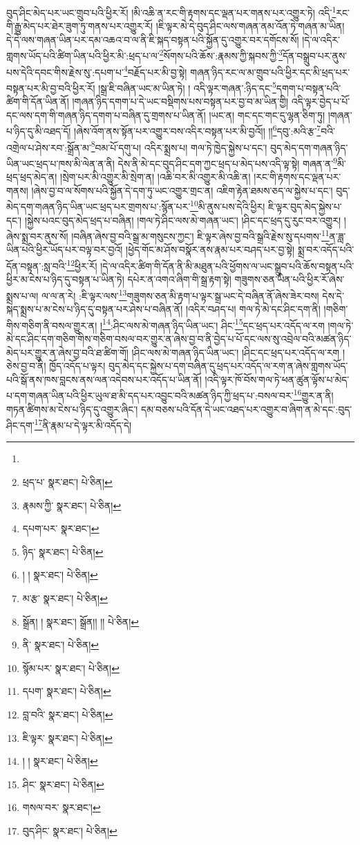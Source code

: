 བུད་ཤིང་མེད་པར་ཡང་གྲུབ་པའི་ཕྱིར་རོ། །མི་འཆི་ན་རང་གི་རྟགས་དང་ལྡན་པར་གནས་པར་འགྱུར་ཏེ། འདི་\footnote{}རང་གི་རྒྱུ་མེད་པར་ཐེར་ཟུག་ཏུ་གནས་པར་འགྱུར་རོ། །ཇི་ལྟར་མེ་དེ་བུད་ཤིང་ལས་གཞན་ནམ་འོན་ཏེ་གཞན་མ་ཡིན། དེ་དེ་ལས་གཞན་ཡིན་པར་དམ་འཆའ་བ་ལ་ནི་ཇི་སྐད་བསྟན་པའི་སྐྱོན་དུ་འགྱུར་བར་དགོངས་སོ། །དེ་ལ་འདིར་གླགས་ཡོད་པའི་ཚིག་ཡིན་པའི་ཕྱིར་མི་:ཕྲད་པ་ལ་\footnote{ཕྲད་པ་  སྣར་ཐང་།  པེ་ཅིན། }སོགས་པའི་ཆོས་:རྣམས་ཀྱི་སྐབས་ཀྱི་\footnote{རྣམས་ཀྱི་  སྣར་ཐང་།  པེ་ཅིན། }དོན་བསྒྲུབ་པར་ནུས་པས་དེའི་དབང་གིས་རྗེས་སུ་:དཔག་པ་\footnote{དཔག་པར་  སྣར་ཐང་། }བརྗོད་པར་མི་བྱ་སྟེ། གཞན་ཉིད་རང་ལ་མ་གྲུབ་པའི་ཕྱིར་དང་མི་ཕྲད་པར་བསྟན་པར་མི་བྱ་བའི་ཕྱིར་རོ། །སྒྲ་ཇི་བཞིན་ཡང་མ་ཡིན་ཏེ། །
འདི་ལྟར་གཞན་:ཉིད་དང་\footnote{ཉིད་  སྣར་ཐང་།  པེ་ཅིན། }དགག་པ་བསྟན་པའི་ཚིག་གི་དོན་ཡིན་ནོ། །གཞན་ཉིད་དགག་པ་དེ་ཡང་བསྡིགས་པས་བསྟན་པར་བྱ་བ་མ་ཡིན་གྱི། འདི་ལྟར་བྱེད་པ་པོ་དང་ལས་དག་གི་གཞན་ཉིད་དགག་པ་བཞིན་དུ་གྲགས་པ་ཡིན་ནོ། །ཡང་ན། གང་དང་གང་དུ་ལྷན་ཅིག་ཏུ། །གཞན་པ་ཉིད་དུ་མི་འཐད་དོ། །ཞེས་འོག་ནས་སྟོན་པར་འགྱུར་བས་འདིར་བསྟན་པར་མི་བྱའོ།། །།\footnote{། །  སྣར་ཐང་།  པེ་ཅིན། }དབུ་:མའི་རྩ་\footnote{མ་རྩ་  སྣར་ཐང་།  པེ་ཅིན། }བའི་འགྲེལ་པ་ཤེས་རབ་:སྒྲོན་མ་\footnote{སྒྲོན། །  སྣར་ཐང་། སྒྲོན།། །།  པེ་ཅིན། }བམ་པོ་དགུ་པ། འདིར་སྨྲས་པ། གལ་ཏེ་ཁྱེད་སྐྱེས་པ་དང་། བུད་མེད་དག་གཞན་ཉིད་ཡིན་ཡང་ཕྲད་པ་ཁས་མི་ལེན་ན་ནི། དེས་ནི་མེ་དང་བུད་ཤིང་དག་ཀྱང་ཕྲད་པ་མེད་པས་འདི་ལྟ་སྟེ། གཞན་ན་\footnote{ནི་  སྣར་ཐང་།  པེ་ཅིན། }མི་ཕྲད་ཕྲད་མེད་ན། །སྲེག་པར་མི་འགྱུར་མི་སྲེག་ན། །འཆི་བར་མི་འགྱུར་མི་འཆི་ན། །རང་གི་རྟགས་དང་ལྡན་པར་གནས། །ཞེས་བྱ་བ་ལ་སོགས་པའི་སྐྱོན་དེ་དག་ཏུ་ཡང་འགྱུར་གྲང་ན། འཇིག་རྟེན་ཐམས་ཅད་ལ་སྐྱེས་པ་དང་། བུད་མེད་དག་གཞན་ཉིད་ཡིན་ཡང་ཕྲད་པར་གྲགས་པ་:སྙོན་པར་\footnote{སྙོམ་པར་  སྣར་ཐང་།  པེ་ཅིན། }མི་ནུས་པས་དེའི་ཕྱིར། ཇི་ལྟར་བུད་མེད་སྐྱེས་པ་དང་། །སྐྱེས་པའང་བུད་མེད་ཕྲད་པ་བཞིན། །གལ་ཏེ་ཤིང་ལས་མེ་གཞན་ཡང་། །ཤིང་དང་ཕྲད་དུ་རུང་བར་འགྱུར། །ཞེས་སྨྲ་བར་ནུས་སོ། །བཞིན་ཞེས་བྱ་བའི་སྒྲ་མ་གསུངས་ཀྱང་། ཇི་ལྟར་ཞེས་བྱ་བའི་སྒྲའི་རྗེས་སུ་དཔགས་\footnote{དཔག་  སྣར་ཐང་།  པེ་ཅིན། }ན་ཟླ་ཡིན་པའི་ཕྱིར་ཡོད་པར་བལྟ་བར་བྱའོ། །ཕྱེད་གོང་མ་ཤོས་བསྣོར་ནས་རྣམ་པར་བཤད་པར་བྱ་སྟེ། སྨྲ་བར་འདོད་པའི་དོན་བསྟན་:སླ་བའི་\footnote{བླ་བའི་  སྣར་ཐང་།  པེ་ཅིན། }ཕྱིར་རོ། །དེ་ལ་འདིར་ཚིག་གི་དོན་ནི་མི་མཐུན་པའི་ཕྱོགས་ལ་ཡང་སྒྲུབ་པའི་ཆོས་བསྟན་པའི་ཕྱིར་མ་ངེས་པ་ཉིད་དུ་བསྟན་པ་ཡིན་ཏེ། དཔེར་ན་འགའ་ཞིག་གི་སྒྲ་རྟག་སྟེ། གཟུགས་ཅན་ཡིན་པའི་ཕྱིར་རོ་ཞེས་སྨྲས་པ་ལ། ལ་ལ་ན་རེ། :ཇི་ལྟར་ལས་\footnote{ཇི་ལྟར་  སྣར་ཐང་།  པེ་ཅིན། }གཟུགས་ཅན་མི་རྟག་པ་ལྟར་སྒྲ་ཡང་དེ་བཞིན་ནོ་ཞེས་ཟེར་བས། དེས་དེ་སྐད་སྨྲས་པ་མ་ངེས་པ་ཉིད་དུ་བསྟན་པར་ཤེས་པ་བཞིན་ནོ། །འདིར་བཤད་པ། གལ་ཏེ་མེ་དང་ཤིང་དག་ནི། །གཅིག་གིས་གཅིག་ནི་བསལ་གྱུར་ན། །\footnote{། །   སྣར་ཐང་།  པེ་ཅིན། }:ཤིང་ལས་མེ་གཞན་ཉིད་ཡིན་ཡང་། ཤིང་\footnote{ཤིང་  སྣར་ཐང་།  པེ་ཅིན། }དང་ཕྲད་པར་འདོད་ལ་རག །གལ་ཏེ་མེ་དང་ཤིང་དག་གཅིག་གིས་གཅིག་བསལ་བར་གྱུར་ན་ཞེས་བྱ་བ་ནི་བྱེད་པ་པོ་དང་ལས་སུ་འབྲེལ་བའི་མཚན་ཉིད་མེད་པར་གྱུར་ན་ཞེས་བྱ་བའི་ཐ་ཚིག་གོ། །ཤིང་ལས་མེ་གཞན་ཉིད་ཡིན་ཡང་། །ཤིང་དང་ཕྲད་པར་འདོད་ལ་རག །ཅེས་བྱ་བ་ནི། ཁྱོད་འདོད་པ་ལྟར། བུད་མེད་དང་སྐྱེས་པ་དག་བཞིན་དུ་ཕྲད་པར་འདོད་ལ་རག་ན་ཞེས་གླགས་ཡོད་པའི་སྒོ་ནས་ཁས་བླངས་ནས་ལན་འདེབས་པར་འདོད་པ་ཡིན་ནོ། །འདི་ལྟར་ཁོ་བོས་གལ་ཏེ་ཕན་ཚུན་ལྟོས་པ་མེད་པ་དག་གཞན་ཡིན་པའི་ཕྱིར་ཡུལ་ཐ་མི་དད་པར་འབྱུང་བའི་མཚན་ཉིད་ཀྱི་ཕྲད་པ་:བསལ་བར་\footnote{གསལ་བར་  སྣར་ཐང་། }གྱུར་ན་ནི། གཏན་ཚིགས་མ་ངེས་པ་ཉིད་དུ་འགྱུར་ཞིང་། དམ་བཅས་པའི་དོན་དེ་ཡང་འཐད་པར་འགྱུར་བ་ཞིག་ན་མེ་དང་:བུད་ཤིང་དག་\footnote{བུད་ཤིང་  སྣར་ཐང་།  པེ་ཅིན། }ནི་རྣམ་པ་དེ་ལྟར་མི་འདོད་དེ། 